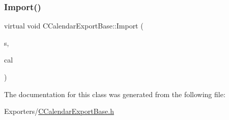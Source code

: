 \subsubsection{\texorpdfstring{Import()}{Import()}}
{\footnotesize\ttfamily virtual void C\+Calendar\+Export\+Base\+::\+Import (\begin{DoxyParamCaption}\item[{std\+::ifstream \&}]{s,  }\item[{\mbox{\hyperlink{class_c_calendar}{C\+Calendar}} \&}]{cal }\end{DoxyParamCaption})\hspace{0.3cm}{\ttfamily [virtual]}}



The documentation for this class was generated from the following file\+:\begin{DoxyCompactItemize}
\item 
Exporters/\mbox{\hyperlink{_c_calendar_export_base_8h}{C\+Calendar\+Export\+Base.\+h}}\end{DoxyCompactItemize}
